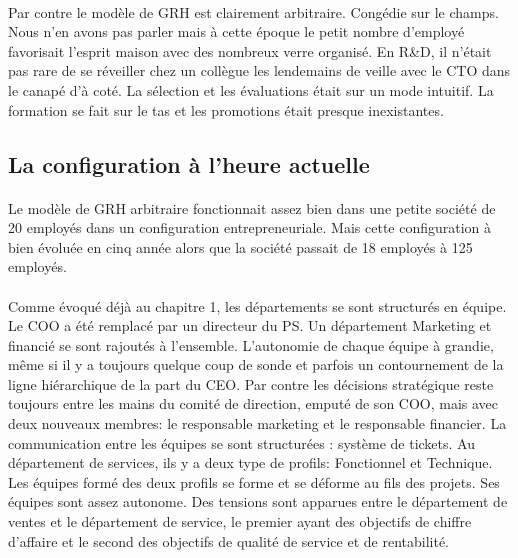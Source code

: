 \paragraph{}Par contre le modèle de GRH est clairement arbitraire\citep[pp. 115-119]{pichault}. Congédie sur le champs. Nous n'en avons pas parler mais à cette époque le petit nombre d'employé favorisait l'esprit maison avec des nombreux verre organisé. En R\&D, il n'était pas rare de se réveiller chez un collègue les lendemains de veille avec le CTO dans le canapé d'à coté. La sélection et les évaluations était sur un mode intuitif.  La formation se fait sur le tas et les promotions était presque inexistantes. 

\subsection{La configuration à l'heure actuelle}
\paragraph{} Le modèle de GRH arbitraire fonctionnait assez bien dans une petite société de 20 employés dans un configuration entrepreneuriale. Mais cette configuration à bien évoluée en cinq année alors que la société passait de 18 employés à 125 employés. 

\paragraph{} Comme évoqué déjà au chapitre 1, les départements se sont structurés en équipe. Le COO a été remplacé par un directeur du PS. Un département Marketing et financié se sont rajoutés à l'ensemble. L'autonomie de chaque équipe à grandie, même si il y a toujours quelque coup de sonde et parfois un contournement de la ligne hiérarchique de la part du CEO. Par contre les décisions stratégique reste toujours entre les mains du comité de direction, emputé de son COO, mais avec deux nouveaux membres: le responsable marketing et le responsable financier. La communication entre les équipes se sont structurées : système de tickets. Au département de services, ils y a deux type de profils: Fonctionnel et Technique. Les équipes formé des deux profils se forme et se déforme au fils des projets. Ses équipes sont assez autonome. Des tensions sont apparues entre le département de ventes et le département de service, le premier ayant des objectifs de chiffre d'affaire et le second des objectifs de qualité de service et de rentabilité.

